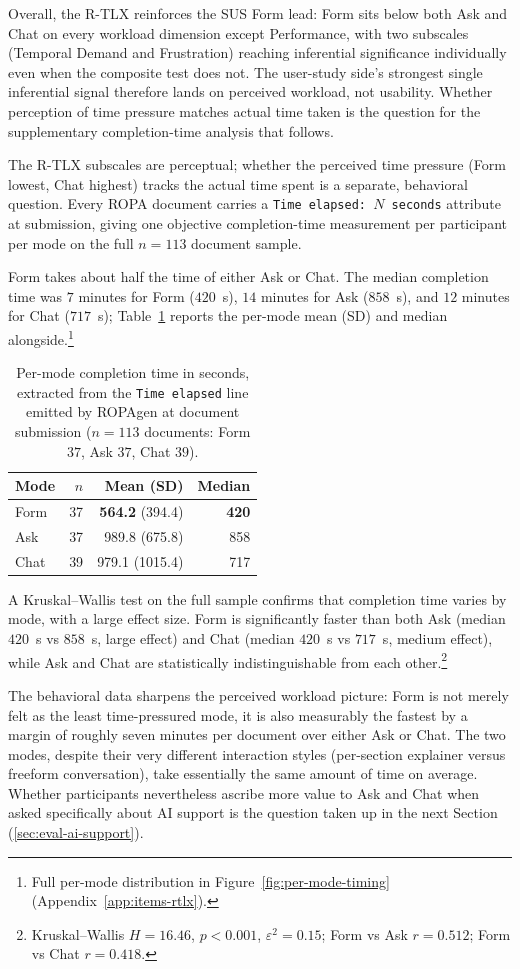 Overall, the R-TLX reinforces the SUS Form lead: Form sits below
both Ask and Chat on every workload dimension except
Performance, with two subscales (Temporal Demand and Frustration)
reaching inferential significance individually even when the
composite test does not. The user-study side's strongest single
inferential signal therefore lands on perceived workload, not
usability. Whether perception of time pressure matches actual
time taken is the question for the supplementary completion-time
analysis that follows.

The R-TLX subscales are perceptual; whether the perceived time
pressure (Form lowest, Chat highest) tracks the actual time spent
is a separate, behavioral question. Every ROPA document carries a
\texttt{Time elapsed: $N$ seconds} attribute at submission, giving
one objective completion-time measurement per participant per
mode on the full $n = 113$ document sample.

Form takes about half the time of either Ask or Chat. The
median completion time was $7$ minutes for Form ($420$~s), $14$
minutes for Ask ($858$~s), and $12$ minutes for Chat ($717$~s);
Table~\ref{tab:per-mode-timing} reports the per-mode mean (SD) and
median alongside.\footnote{Full per-mode distribution in
Figure~\ref{fig:per-mode-timing} (Appendix~\ref{app:items-rtlx}).}

\begin{table}[htbp]
\centering
\caption{Per-mode completion time in seconds, extracted from the
\texttt{Time elapsed} line emitted by ROPAgen at document
submission ($n = 113$ documents: Form $37$, Ask $37$, Chat $39$).}
\label{tab:per-mode-timing}
\begin{tabular}{@{}l r r r@{}}
\toprule
Mode & $n$ & Mean (SD) & Median \\
\midrule
Form & 37 & \textbf{564.2} (394.4) & \textbf{420} \\
Ask  & 37 & 989.8 (675.8) & 858 \\
Chat & 39 & 979.1 (1015.4) & 717 \\
\bottomrule
\end{tabular}
\end{table}

A Kruskal--Wallis test on the full sample confirms that
completion time varies by mode, with a large effect size. Form is
significantly faster than both Ask (median $420$~s vs $858$~s,
large effect) and Chat (median $420$~s vs $717$~s, medium
effect), while Ask and Chat are statistically indistinguishable
from each other.\footnote{Kruskal--Wallis $H = 16.46$,
$p < 0.001$, $\varepsilon^2 = 0.15$; Form vs Ask $r = 0.512$;
Form vs Chat $r = 0.418$.}

The behavioral data sharpens the perceived workload picture: Form
is not merely felt as the least time-pressured mode, it is also
measurably the fastest by a margin of roughly seven minutes per
document over either Ask or Chat. The two modes, despite their
very different interaction styles (per-section explainer versus
freeform conversation), take essentially the same amount of time
on average.
Whether participants nevertheless ascribe more value to Ask and
Chat when asked specifically about AI support is the
question taken up in the next Section (\ref{sec:eval-ai-support}).
